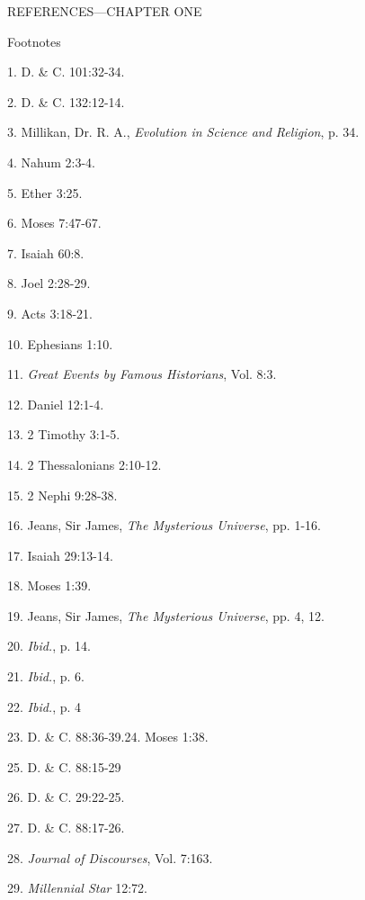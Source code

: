 \newpage
REFERENCES—CHAPTER ONE

Footnotes

1. D. \& C. 101:32-34.

2. D. \& C. 132:12-14.

3. Millikan, Dr. R. A., \textit{Evolution in Science and Religion}, p. 34.

4. Nahum 2:3-4.

5. Ether 3:25.

6. Moses 7:47-67.

7. Isaiah 60:8.

8. Joel 2:28-29.

9. Acts 3:18-21.

10. Ephesians 1:10.

11. \textit{Great Events by Famous Historians}, Vol. 8:3.

12. Daniel 12:1-4.

13. 2 Timothy 3:1-5.

14. 2 Thessalonians 2:10-12.

15. 2 Nephi 9:28-38.

16. Jeans, Sir James, \textit{The Mysterious Universe}, pp. 1-16.

17. Isaiah 29:13-14.

18. Moses 1:39.

19. Jeans, Sir James, \textit{The Mysterious Universe}, pp. 4, 12.

20. \textit{Ibid.}, p. 14.

21. \textit{Ibid.}, p. 6.

22. \textit{Ibid.}, p. 4

23. D. \& C. 88:36-39.24. Moses 1:38.

25. D. \& C. 88:15-29

26. D. \& C. 29:22-25.

27. D. \& C. 88:17-26.

28. \textit{Journal of Discourses}, Vol. 7:163.

29. \textit{Millennial Star} 12:72.

